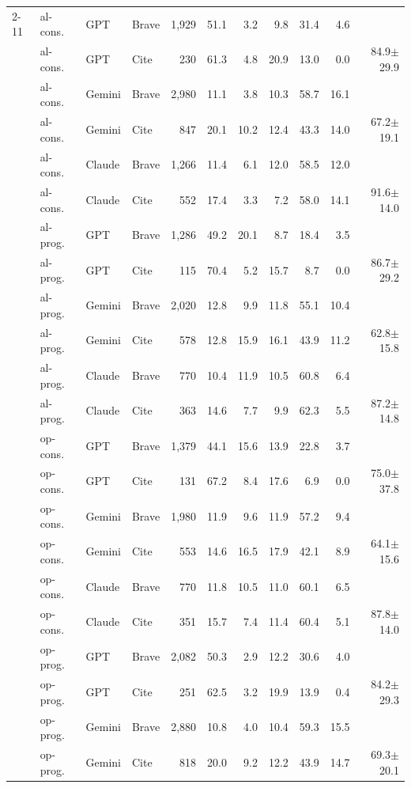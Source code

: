 \begin{table}[t]
\begin{tabular}{llllrrrrrrr}
\cmidrule(lr){2-11}
 & al-cons. & GPT & Brave & 1{,}929 & 51.1 & 3.2 & 9.8 & 31.4 & 4.6 &  \\
 & al-cons. & GPT & Cite & 230 & 61.3 & 4.8 & 20.9 & 13.0 & 0.0 & 84.9$\pm$29.9 \\
 & al-cons. & Gemini & Brave & 2{,}980 & 11.1 & 3.8 & 10.3 & 58.7 & 16.1 &  \\
 & al-cons. & Gemini & Cite & 847 & 20.1 & 10.2 & 12.4 & 43.3 & 14.0 & 67.2$\pm$19.1 \\
 & al-cons. & Claude & Brave & 1{,}266 & 11.4 & 6.1 & 12.0 & 58.5 & 12.0 &  \\
 & al-cons. & Claude & Cite & 552 & 17.4 & 3.3 & 7.2 & 58.0 & 14.1 & 91.6$\pm$14.0 \\
 & al-prog. & GPT & Brave & 1{,}286 & 49.2 & 20.1 & 8.7 & 18.4 & 3.5 &  \\
 & al-prog. & GPT & Cite & 115 & 70.4 & 5.2 & 15.7 & 8.7 & 0.0 & 86.7$\pm$29.2 \\
 & al-prog. & Gemini & Brave & 2{,}020 & 12.8 & 9.9 & 11.8 & 55.1 & 10.4 &  \\
 & al-prog. & Gemini & Cite & 578 & 12.8 & 15.9 & 16.1 & 43.9 & 11.2 & 62.8$\pm$15.8 \\
 & al-prog. & Claude & Brave & 770 & 10.4 & 11.9 & 10.5 & 60.8 & 6.4 &  \\
 & al-prog. & Claude & Cite & 363 & 14.6 & 7.7 & 9.9 & 62.3 & 5.5 & 87.2$\pm$14.8 \\
 & op-cons. & GPT & Brave & 1{,}379 & 44.1 & 15.6 & 13.9 & 22.8 & 3.7 &  \\
 & op-cons. & GPT & Cite & 131 & 67.2 & 8.4 & 17.6 & 6.9 & 0.0 & 75.0$\pm$37.8 \\
 & op-cons. & Gemini & Brave & 1{,}980 & 11.9 & 9.6 & 11.9 & 57.2 & 9.4 &  \\
 & op-cons. & Gemini & Cite & 553 & 14.6 & 16.5 & 17.9 & 42.1 & 8.9 & 64.1$\pm$15.6 \\
 & op-cons. & Claude & Brave & 770 & 11.8 & 10.5 & 11.0 & 60.1 & 6.5 &  \\
 & op-cons. & Claude & Cite & 351 & 15.7 & 7.4 & 11.4 & 60.4 & 5.1 & 87.8$\pm$14.0 \\
 & op-prog. & GPT & Brave & 2{,}082 & 50.3 & 2.9 & 12.2 & 30.6 & 4.0 &  \\
 & op-prog. & GPT & Cite & 251 & 62.5 & 3.2 & 19.9 & 13.9 & 0.4 & 84.2$\pm$29.3 \\
 & op-prog. & Gemini & Brave & 2{,}880 & 10.8 & 4.0 & 10.4 & 59.3 & 15.5 &  \\
 & op-prog. & Gemini & Cite & 818 & 20.0 & 9.2 & 12.2 & 43.9 & 14.7 & 69.3$\pm$20.1 \\

\end{tabular}
\end{table}
